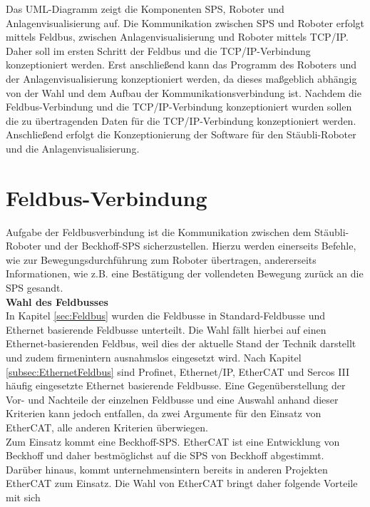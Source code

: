\documentclass[ a4paper,
                oneside,
                toc=bibliography,
                toc=listof
                ]{scrbook}
\begin{document}
	Das UML-Diagramm zeigt die Komponenten SPS, Roboter und Anlagenvisualisierung auf. Die Kommunikation zwischen SPS und Roboter erfolgt mittels Feldbus, zwischen Anlagenvisualisierung und Roboter mittels TCP/IP. Daher soll im ersten Schritt der Feldbus und die TCP/IP-Verbindung konzeptioniert werden. Erst anschließend kann das Programm des Roboters und der Anlagenvisualisierung konzeptioniert werden, da dieses maßgeblich abhängig von der Wahl und dem Aufbau der Kommunikationsverbindung ist. Nachdem die Feldbus-Verbindung und die TCP/IP-Verbindung konzeptioniert wurden sollen die zu übertragenden Daten für die TCP/IP-Verbindung konzeptioniert werden. Anschließend erfolgt die Konzeptionierung der Software für den Stäubli-Roboter und die Anlagenvisualisierung.
	 
	\section{Feldbus-Verbindung}
	Aufgabe der Feldbusverbindung ist die Kommunikation zwischen dem Stäubli-Roboter und der Beckhoff-SPS sicherzustellen. Hierzu werden einerseits Befehle, wie zur Bewegungsdurchführung zum Roboter übertragen, andererseits Informationen, wie z.B. eine Bestätigung der vollendeten Bewegung zurück an die SPS gesandt.\\
	\textbf{Wahl des Feldbusses}\\
	In Kapitel \ref{sec:Feldbus} wurden die Feldbusse in Standard-Feldbusse und Ethernet basierende Feldbusse unterteilt. Die Wahl fällt hierbei auf einen Ethernet-basierenden Feldbus, weil dies der aktuelle Stand der Technik darstellt und zudem firmenintern ausnahmslos eingesetzt wird. Nach Kapitel \ref{subsec:EthernetFeldbus} sind Profinet, Ethernet/IP, EtherCAT und Sercos III häufig eingesetzte Ethernet basierende Feldbusse. Eine Gegenüberstellung der Vor- und Nachteile der einzelnen Feldbusse und eine Auswahl anhand dieser Kriterien kann jedoch entfallen, da zwei Argumente für den Einsatz von EtherCAT, alle anderen Kriterien überwiegen.\\
	Zum Einsatz kommt eine Beckhoff-SPS. EtherCAT ist eine Entwicklung von Beckhoff und daher bestmöglichst auf die SPS von Beckhoff abgestimmt.\\
	Darüber hinaus, kommt unternehmensintern bereits in anderen Projekten EtherCAT zum Einsatz. Die Wahl von EtherCAT bringt daher folgende Vorteile mit sich
\end{document}
